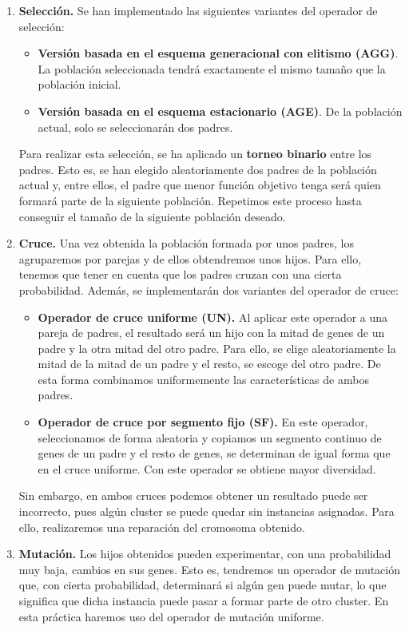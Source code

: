 		\begin{enumerate}
			\item \textbf{Selección.} Se han implementado las siguientes variantes del operador de selección:
			\begin{itemize}
				\item \textbf{Versión basada en el esquema generacional con elitismo (AGG)}. La población seleccionada tendrá exactamente el mismo tamaño que la población inicial.
				\item \textbf{Versión basada en el esquema estacionario (AGE)}. De la población actual, solo se seleccionarán dos padres.
			\end{itemize}

				Para realizar esta selección, se ha aplicado un \textbf{torneo binario} entre los padres. Esto es, se han elegido aleatoriamente dos padres de la población actual y, entre ellos, el padre que menor función objetivo tenga 
				será quien formará parte de la siguiente población. Repetimos este proceso hasta conseguir el tamaño de la siguiente población deseado.
			
				\item \textbf{Cruce.} Una vez obtenida la población formada por unos padres, los agruparemos por parejas y de ellos obtendremos unos hijos. Para ello, tenemos que tener en cuenta que los padres cruzan con una cierta probabilidad.
				Además, se implementarán dos variantes del operador de cruce: 
				
				\begin{itemize}
					\item \textbf{Operador de cruce uniforme (UN).} Al aplicar este operador a una pareja de padres, el resultado será un hijo con la mitad de genes de un padre y la otra mitad del otro padre. Para ello, se elige aleatoriamente la mitad 
					de la mitad de un padre y el resto, se escoge del otro padre. De esta forma combinamos uniformemente las características de ambos padres. 

					\item \textbf{Operador de cruce por segmento fijo (SF).} En este operador, seleccionamos de forma aleatoria y copiamos un segmento continuo de genes de un padre y el resto de genes, se determinan de igual forma que en el cruce uniforme. Con este operador se obtiene mayor diversidad.
				\end{itemize}

				Sin embargo, en ambos cruces podemos obtener un resultado puede ser incorrecto, pues algún cluster se puede quedar sin instancias asignadas. Para ello, realizaremos una reparación del cromosoma obtenido.
			\item \textbf{Mutación.} Los hijos obtenidos pueden experimentar, con una probabilidad muy baja, cambios en sus genes. Esto es, tendremos un operador de mutación que, con cierta probabilidad, determinará 
				si algún gen puede mutar, lo que significa que dicha instancia puede pasar a formar parte de otro cluster. En esta práctica haremos uso del operador de mutación uniforme.


\end{enumerate}
